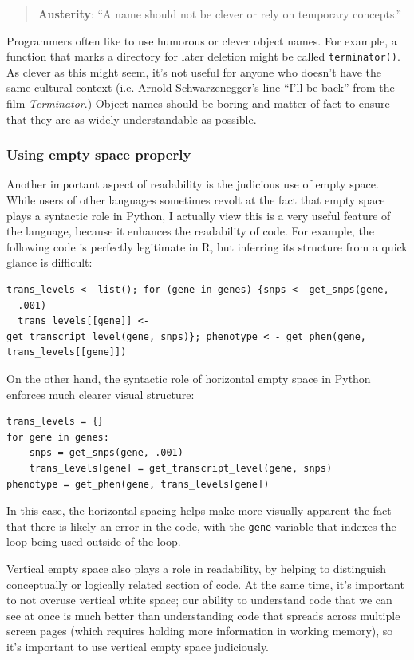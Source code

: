 \begin{quote}
\textbf{Austerity}: ``A name should not be clever or rely on temporary concepts.''
\end{quote}

Programmers often like to use humorous or clever object names.
For example, a function that marks a directory for later deletion might be called \texttt{terminator()}. As clever as this might seem, it's not useful for anyone who doesn't have the same cultural context (i.e. Arnold Schwarzenegger's line ``I'll be back'' from the film \textit{Terminator}.)
Object names should be boring and matter-of-fact to ensure that they are as widely understandable as possible.

\subsubsection{Using empty space properly}

Another important aspect of readability is the judicious use of empty space.
While users of other languages sometimes revolt at the fact that empty space plays a syntactic role in Python, I actually view this is a very useful feature of the language, because it enhances the readability of code.
For example, the following code is perfectly legitimate in R, but inferring its structure from a quick glance is difficult:

\begin{lstlisting}[style=R]
trans_levels <- list(); for (gene in genes) {snps <- get_snps(gene, 
  .001)
  trans_levels[[gene]] <- 
get_transcript_level(gene, snps)}; phenotype < - get_phen(gene, trans_levels[[gene]])
\end{lstlisting}

On the other hand, the syntactic role of horizontal empty space in Python enforces much clearer visual structure:

\begin{lstlisting}[style=Python]
trans_levels = {}
for gene in genes:
    snps = get_snps(gene, .001)
    trans_levels[gene] = get_transcript_level(gene, snps)
phenotype = get_phen(gene, trans_levels[gene])
\end{lstlisting}

In this case, the horizontal spacing helps make more visually apparent the fact that there is likely an error in the code, with the \texttt{gene} variable that indexes the loop being used outside of the loop.

Vertical empty space also plays a role in readability, by helping to distinguish conceptually or logically related section of code.
At the same time, it's important to not overuse vertical white space; our ability to understand code that we can see at once is much better than understanding code that spreads across multiple screen pages (which requires holding more information in working memory), so it's important to use vertical empty space judiciously.

